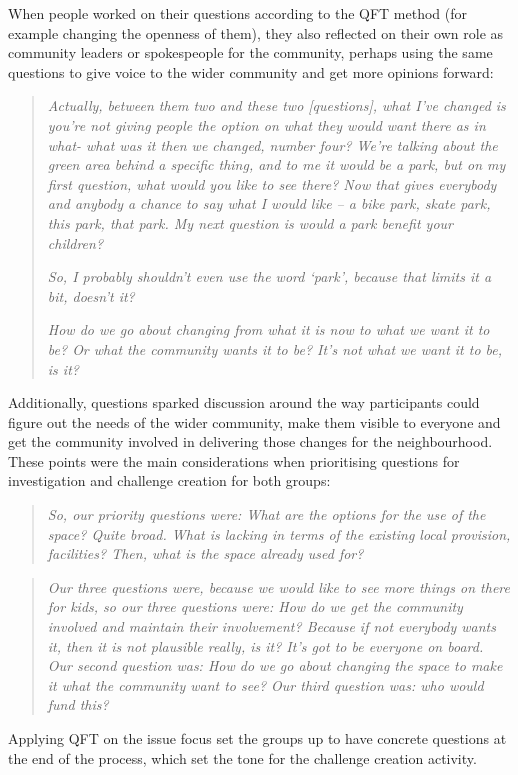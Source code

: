 When people worked on their questions according to the QFT method (for example changing the openness of them), they also reflected on their own role as community leaders or spokespeople for the community, perhaps using the same questions to give voice to the wider community and get more opinions forward:
\begin{quote}
   \textit{Actually, between them two and these two [questions], what I've changed is you're not giving people the option on what they would want there as in what- what was it then we changed, number four? We're talking about the green area behind a specific thing, and to me it would be a park, but on my first question, what would you like to see there? Now that gives everybody and anybody a chance to say what I would like -- a bike park, skate park, this park, that park. My next question is would a park benefit your children?}
    
    \textit{So, I probably shouldn't even use the word `park', because that limits it a bit, doesn't it?}
    
    \textit{How do we go about changing from what it is now to what we want it to be? Or what the community wants it to be? It's not what we want it to be, is it?}
\end{quote}

Additionally, questions sparked discussion around the way participants could figure out the needs of the wider community, make them visible to everyone and get the community involved in delivering those changes for the neighbourhood. These points were the main considerations when prioritising questions for investigation and challenge creation for both groups:
\begin{quote}
    \textit{So, our priority questions were: What are the options for the use of the space? Quite broad. What is lacking in terms of the existing local provision, facilities? Then, what is the space already used for?}
\end{quote}
\begin{quote}
    \textit{Our three questions were, because we would like to see more things on there for kids, so our three questions were: How do we get the community involved and maintain their involvement? Because if not everybody wants it, then it is not plausible really, is it? It's got to be everyone on board. Our second question was: How do we go about changing the space to make it what the community want to see? Our third question was: who would fund this?}
\end{quote}
Applying QFT on the issue focus set the groups up to have concrete questions at the end of the process, which set the tone for the challenge creation activity.

